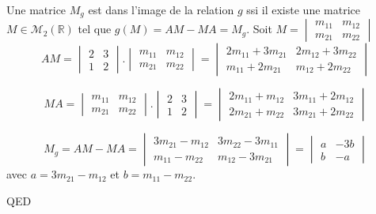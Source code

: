 \documentclass[]{book}
\theoremstyle{definition}
\newcommand{\bb}[1]{\mathbb{#1}}
\newcommand{\R}{\bb{R}}
\begin{document}
Une matrice $M_g$ est dans l'image de la relation $g$ ssi il existe une matrice $M \in \mathcal{M}_2(\R)$ tel que $g(M) = AM - MA = M_g$. Soit $M = \begin{vmatrix} m_{11} & m_{12} \\ m_{21} & m_{22} \end{vmatrix}$\\

$$
AM = \begin{vmatrix} 2 & 3 \\ 1 & 2 \end{vmatrix} . \begin{vmatrix} m_{11} & m_{12} \\ m_{21} & m_{22} \end{vmatrix} =
\begin{vmatrix} 2m_{11} +  3m_{21} & 2m_{12} + 3m_{22} \\ m_{11} + 2 m_{21} & m_{12} + 2m_{22} \end{vmatrix}
$$

$$
MA = \begin{vmatrix} m_{11} & m_{12} \\ m_{21} & m_{22} \end{vmatrix} . \begin{vmatrix} 2 & 3 \\ 1 & 2 \end{vmatrix}  =
\begin{vmatrix} 2m_{11} +  m_{12} & 3m_{11} + 2m_{12} \\ 2m_{21} + m_{22} & 3m_{21} + 2m_{22} \end{vmatrix}
$$

$$
M_g = AM - MA = 
\begin{vmatrix} 3m_{21} -  m_{12} & 3m_{22} - 3m_{11} \\ m_{11} - m_{22} & m_{12} - 3m_{21} \end{vmatrix} =
\begin{vmatrix} a & -3b \\ b & -a \end{vmatrix}
$$
avec $a=3m_{21} -  m_{12}$ et $b = m_{11} - m_{22}$.

QED
\end{document}

